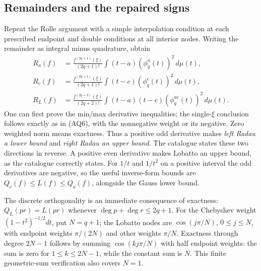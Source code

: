 \documentclass[11pt,a4paper]{article}
\theoremstyle{definition}
\begin{document}
\subsection*{Remainders and the repaired signs}
Repeat the Rolle argument with a simple interpolation condition at
each prescribed endpoint and double conditions at all interior nodes.
Writing the remainder as integral minus quadrature, obtain
\begin{align}
 R_a(f)&=\frac{f^{(2q+1)}(\xi)}{(2q+1)!}
            \int(t-a)(\phi_q^a(t))^2\,d\mu(t),\tag{AQ9}\\
 R_c(f)&=\frac{f^{(2q+1)}(\xi)}{(2q+1)!}
            \int(t-c)(\phi_q^c(t))^2\,d\mu(t),\tag{AQ10}\\
 R_L(f)&=\frac{f^{(2q+2)}(\xi)}{(2q+2)!}
            \int(t-a)(t-c)(\phi_q^{ac}(t))^2\,d\mu(t).\tag{AQ11}
\end{align}
One can first prove the min/max derivative inequalities; the
single-$\xi$ conclusion follows exactly as in (AQ6), with the
nonnegative weight or its negative.  Zero weighted norm means exactness.
Thus a positive odd derivative makes \emph{left Radau a lower bound}
and \emph{right Radau an upper bound}.  The catalogue states these two
directions in reverse.  A positive even derivative makes Lobatto
an upper bound, as the catalogue correctly states.
For $1/t$ and $1/t^2$ on a positive interval the odd derivatives are
negative, so the useful inverse-form bounds are
$Q_c(f)\le L(f)\le Q_a(f)$, alongside the Gauss lower bound.

The discrete orthogonality is an immediate consequence of exactness:
$Q_L(pr)=L(pr)$ whenever $\deg p+\deg r\le2q+1$.
For the Chebyshev weight $(1-t^2)^{-1/2}dt$, put $N=q+1$;
the Lobatto nodes are $\cos(j\pi/N)$, $0\le j\le N$,
with endpoint weights $\pi/(2N)$ and other weights $\pi/N$.
Exactness through degree $2N-1$ follows by summing
$\cos(kj\pi/N)$ with half endpoint weights: the sum is zero
for $1\le k\le2N-1$, while the constant sum is $N$.
This finite geometric-sum verification also covers $N=1$.
\end{document}
